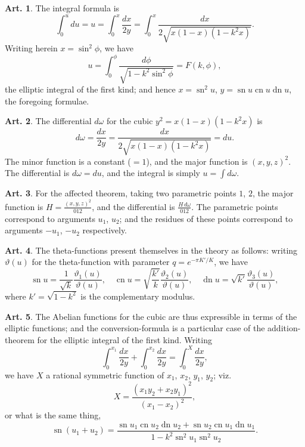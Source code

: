 \documentclass[12pt,a4paper]{article}
\theoremstyle{definition}
\newtheorem{art}{Art.}[section]
\DeclareMathOperator{\sn}{sn}
\DeclareMathOperator{\cn}{cn}
\DeclareMathOperator{\dn}{dn}
\begin{document}
\begin{art}\label{art:122}
The integral formula is
\[
\int_0^u du = u = \int_0^x \frac{dx}{2y} = \int_0^x \frac{dx}{2\sqrt{x(1-x)(1-k^2x)}}.
\]
Writing herein $x = \sin^2\phi$, we have
\[
u = \int_0^\phi \frac{d\phi}{\sqrt{1 - k^2\sin^2\phi}} = F(k, \phi),
\]
the elliptic integral of the first kind; and hence $x = \sn^2 u$, $y = \sn u \cn u \dn u$, the foregoing formulae.
\end{art}

\begin{art}\label{art:123}
The differential $d\omega$ for the cubic $y^2 = x(1-x)(1-k^2x)$ is
\[
d\omega = \frac{dx}{2y} = \frac{dx}{2\sqrt{x(1-x)(1-k^2x)}} = du.
\]
The minor function is a constant ($= 1$), and the major function is $(x, y, z)^2$. The differential is $d\omega = du$, and the integral is simply $u = \int d\omega$.
\end{art}

\newpage
\begin{art}\label{art:124}
For the affected theorem, taking two parametric points $1$, $2$, the major function is $H = \frac{(x, y, z)^2}{012}$, and the differential is $\frac{H\,d\omega}{012}$. The parametric points correspond to arguments $u_1$, $u_2$; and the residues of these points correspond to arguments $-u_1$, $-u_2$ respectively.
\end{art}

\begin{art}\label{art:125}
The theta-functions present themselves in the theory as follows: writing $\vartheta(u)$ for the theta-function with parameter $q = e^{-\pi K'/K}$, we have
\[
\sn u = \frac{1}{\sqrt{k}} \frac{\vartheta_1(u)}{\vartheta(u)}, \quad \cn u = \sqrt{\frac{k'}{k}} \frac{\vartheta_2(u)}{\vartheta(u)}, \quad \dn u = \sqrt{k'} \frac{\vartheta_3(u)}{\vartheta(u)},
\]
where $k' = \sqrt{1 - k^2}$ is the complementary modulus.
\end{art}

\begin{art}\label{art:126}
The Abelian functions for the cubic are thus expressible in terms of the elliptic functions; and the conversion-formula is a particular case of the addition-theorem for the elliptic integral of the first kind. Writing
\[
\int_0^{x_1} \frac{dx}{2y} + \int_0^{x_2} \frac{dx}{2y} = \int_0^X \frac{dx}{2y},
\]
we have $X$ a rational symmetric function of $x_1$, $x_2$, $y_1$, $y_2$; viz.
\[
X = \frac{(x_1 y_2 + x_2 y_1)^2}{(x_1 - x_2)^2},
\]
or what is the same thing,
\[
\sn(u_1 + u_2) = \frac{\sn u_1 \cn u_2 \dn u_2 + \sn u_2 \cn u_1 \dn u_1}{1 - k^2 \sn^2 u_1 \sn^2 u_2}.
\]
\end{art}
\end{document}
